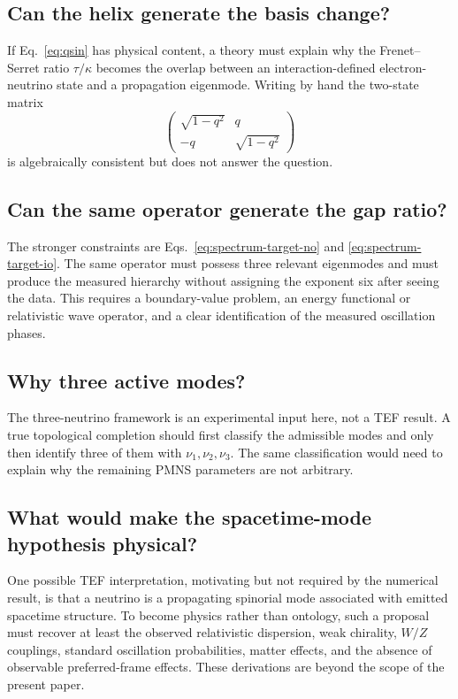 \documentclass[10pt,twocolumn]{article}
\begin{document}
\subsection{Can the helix generate the basis change?}

If Eq.~\eqref{eq:qsin} has physical content, a theory must explain why the
Frenet--Serret ratio $\tau/\kappa$ becomes the overlap between an
interaction-defined electron-neutrino state and a propagation eigenmode.  Writing
by hand the two-state matrix
\begin{equation}
\begin{pmatrix}
\sqrt{1-q^2} & q\\
-q & \sqrt{1-q^2}
\end{pmatrix}
\end{equation}
is algebraically consistent but does not answer the question.

\subsection{Can the same operator generate the gap ratio?}

The stronger constraints are Eqs.~\eqref{eq:spectrum-target-no} and \eqref{eq:spectrum-target-io}.  The same operator
must possess three relevant eigenmodes and must produce the measured hierarchy
without assigning the exponent six after seeing the data.  This requires a
boundary-value problem, an energy functional or relativistic wave operator, and a
clear identification of the measured oscillation phases.

\subsection{Why three active modes?}

The three-neutrino framework is an experimental input here, not a TEF result.  A
true topological completion should first classify the admissible modes and only
then identify three of them with $\nu_1,\nu_2,\nu_3$.  The same classification
would need to explain why the remaining PMNS parameters are not arbitrary.

\subsection{What would make the spacetime-mode hypothesis physical?}

One possible TEF interpretation, motivating but not required by the numerical
result, is that a neutrino is a propagating spinorial mode associated with emitted
spacetime structure.  To become physics rather than ontology, such a proposal must
recover at least the observed relativistic dispersion, weak chirality, $W/Z$
couplings, standard oscillation probabilities, matter effects, and the absence of
observable preferred-frame effects.  These derivations are beyond the scope of the present paper.
\end{document}
